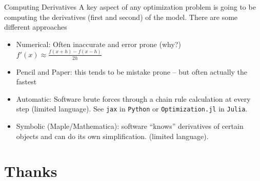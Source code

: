 \begin{frame}{Computing Derivatives}
A key aspect of any optimization problem is going to be computing the derivatives (first and second) of the model.  There are some different approaches
\begin{itemize}
\item Numerical: Often inaccurate and error prone (why?) $f'(x) \approx \frac{f(x+h)-f(x-h)}{2h}$
\item Pencil and Paper: this tends to be mistake prone -- but often actually the fastest
\item Automatic: Software brute forces through a chain rule calculation at every step (limited language). See \texttt{jax} in \texttt{Python} or \texttt{Optimization.jl} in \texttt{Julia}.
\item Symbolic (Maple/Mathematica): software ``knows'' derivatives of certain objects and can do its own simplification.  (limited language).
\end{itemize}
\end{frame}






\section*{Thanks}


